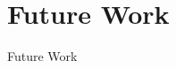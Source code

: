 \chapter{Future Work}
\label{future}


Future Work


\renewcommand\thefigure{\thechapter .\arabic{figure}}
